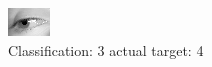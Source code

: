 \begin{figure}[h!]
\begin{center}
\includegraphics[width=0.60\columnwidth]{figures/ID3057_class_3_target_4.png}
\end{center}
\caption{ Classification: 3 actual target: 4}
\label{fig:ID3057_class_3_target_4}
\end{figure}
